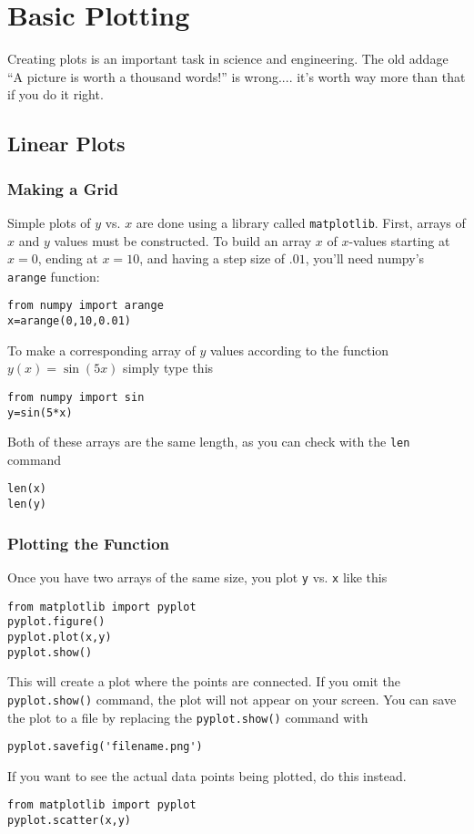 \chapter{Basic Plotting}
\label{chap:1DPlots}

Creating plots is an important task in science and engineering.  The
old addage ``A picture is worth a thousand words!'' is wrong.... it's
worth way more than that if you do it right.
\medskip

\section{Linear Plots}

\subsection*{Making a Grid}
 Simple plots of $y$ vs. $x$ are done using a
library called \texttt{matplotlib}.  First, arrays of $x$ and $y$
values must be constructed.  To build an array $x$ of $x$-values
starting at $x=0$, ending at $x=10$, and having a step size of
$.01$, you'll need numpy's \texttt{arange} function:
\begin{Verbatim}
from numpy import arange
x=arange(0,10,0.01)
\end{Verbatim}
To make a corresponding array of $y$ values according to the
function $y(x)=\sin(5x)$ simply type this
\begin{Verbatim}
from numpy import sin
y=sin(5*x)
\end{Verbatim}
Both of these arrays are the same length, as you can check with the
{\tt len} command
\begin{Verbatim}
len(x)
len(y)
\end{Verbatim}

\subsection*{Plotting the Function}
Once you have two arrays of the same size, you plot \texttt{y} vs.
\texttt{x} like this
\begin{Verbatim}
from matplotlib import pyplot
pyplot.figure()
pyplot.plot(x,y)
pyplot.show()
\end{Verbatim}
This will create a plot where the points are connected.  If you omit
the \texttt{pyplot.show()} command, the plot will not appear on your
screen.  You can save the plot to a file by replacing the
\texttt{pyplot.show()}  command with
\begin{Verbatim}
pyplot.savefig('filename.png')
\end{Verbatim}
If you want to see the actual data points being plotted, do this
instead.
\begin{Verbatim}
from matplotlib import pyplot
pyplot.scatter(x,y)
\end{Verbatim}

